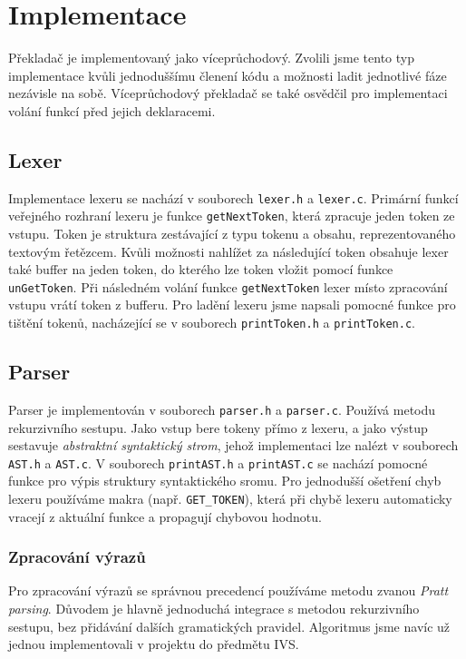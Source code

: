 \section{Implementace}
Překladač je implementovaný jako víceprůchodový.
Zvolili jsme tento typ implementace kvůli jednoduššímu členení kódu a možnosti ladit jednotlivé fáze nezávisle na sobě.
Víceprůchodový překladač se také osvědčil pro implementaci volání funkcí před jejich deklaracemi.

\subsection{Lexer}
Implementace lexeru se nachází v souborech \texttt{lexer.h} a \texttt{lexer.c}.
Primární funkcí veřejného rozhraní lexeru je funkce \texttt{getNextToken}, která zpracuje jeden token ze vstupu.
Token je struktura zestávající z typu tokenu a obsahu, reprezentovaného textovým řetězcem.
Kvůli možnosti nahlížet za následující token obsahuje lexer také buffer na jeden token, do kterého lze token vložit pomocí
funkce \texttt{unGetToken}. Při následném volání funkce \texttt{getNextToken} lexer místo zpracování vstupu vrátí token z bufferu.
Pro ladění lexeru jsme napsali pomocné funkce pro tištění tokenů, nacházející se v souborech \texttt{printToken.h} a \texttt{printToken.c}.

\subsection{Parser}
Parser je implementován v souborech \texttt{parser.h} a \texttt{parser.c}.
Používá metodu rekurzivního sestupu.
Jako vstup bere tokeny přímo z lexeru, a jako výstup sestavuje \textit{abstraktní syntaktický strom},
jehož implementaci lze nalézt v souborech \texttt{AST.h} a \texttt{AST.c}.
V souborech \texttt{printAST.h} a \texttt{printAST.c} se nachází pomocné funkce pro výpis struktury syntaktického sromu.
Pro jednodušší ošetření chyb lexeru používáme makra (např. \texttt{GET\_TOKEN}),
která při chybě lexeru automaticky vracejí z aktuální funkce a propagují chybovou hodnotu.

\subsubsection{Zpracování výrazů}
Pro zpracování výrazů se správnou precedencí používáme metodu zvanou \textit{Pratt parsing}.
Důvodem je hlavně jednoduchá integrace s metodou rekurzivního sestupu, bez přidávání dalších gramatických pravidel.
Algoritmus jsme navíc už jednou implementovali v projektu do předmětu IVS.

